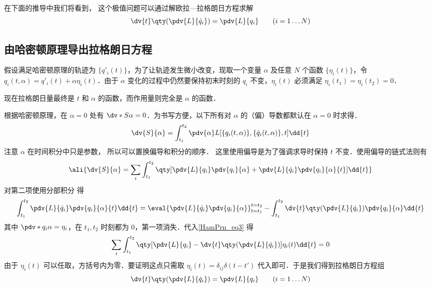 在下面的推导中我们将看到， 这个极值问题可以通过解欧拉—拉格朗日方程求解
\begin{equation}
\dv{t} \qty(\pdv{L}{\dot q_i}) = \pdv{L}{q_i} \qquad
(i = 1\dots N)
\end{equation}

\subsection{由哈密顿原理导出拉格朗日方程}

假设满足哈密顿原理的轨迹为 $\{q'_i(t)\}$，为了让轨迹发生微小改变，现取一个变量 $\alpha$ 及任意 $N$ 个函数 $\{\eta_i(t)\}$，令 $q_i(t,\alpha ) = q'_i(t) + \alpha \eta_i(t)$．由于 $\alpha$ 变化的过程中仍然要保持初末时刻的 $q_i$ 不变，$\eta_i(t)$ 必须满足 $\eta_i(t_1) = \eta_i(t_2) = 0$．

现在拉格朗日量最终是 $t$ 和 $\alpha$ 的函数，而作用量则完全是 $\alpha$ 的函数．
 
根据哈密顿原理，在 $\alpha = 0$ 处有 $\dv*{S}{\alpha} = 0$．为书写方便，以下所有对 $\alpha$ 的（偏）导数都默认在 $\alpha=0$ 时求得．
\begin{equation}
\dv{S}{\alpha} = \int_{t_1}^{t_2} \pdv{\alpha} L[\{q_i(t,\alpha )\}, \{\dot q_i(t,\alpha)\}, t] \dd{t}
\end{equation}
注意 $\alpha$ 在时间积分中只是参数， 所以可以置换偏导和积分的顺序． %
这里使用偏导是为了强调求导时保持 $t$ 不变．使用偏导的链式法则有
\begin{equation}\label{HamPrn_eq3}
\ali{
\dv{S}{\alpha} =
\sum_i \int_{t_1}^{t_2} \qty[\pdv{L}{q_i} \pdv{q_i}{\alpha} + \pdv{L}{\dot q_i}\pdv{q_i}{\alpha}{t}] \dd{t}
}\end{equation}
对第二项使用分部积分 得
\begin{equation}
\int_{t_1}^{t_2} \pdv{L}{\dot q_i} \pdv{q_i}{\alpha}{t} \dd{t}  = \eval{\pdv{L}{\dot q_i}\pdv{q_i}{\alpha}}_{t = t_1}^{t = t_2} - \int_{t_1}^{t_2} \dv{t} \qty(\pdv{L}{\dot q_i})\pdv{q_i}{\alpha} \dd{t}
\end{equation}
其中 $\pdv*{q_i}{\alpha}  = \eta_i$，在 $t_1, t_2$ 时刻都为 0，第一项消失．代入\autoref{HamPrn_eq3} 得
\begin{equation}
\sum_i \int_{t_1}^{t_2} \qty[\pdv{L}{q_i} - \dv{t} \qty(\pdv{L}{\dot q_i})] \eta_i(t) \dd{t} = 0
\end{equation}
由于 $\eta_i(t)$ 可以任取，方括号内为零．要证明这点只需取 $\eta_i(t) = \delta_{ij}\delta(t - t')$ 代入即可．于是我们得到拉格朗日方程组
\begin{equation}\label{HamPrn_eq2}
\dv{t} \qty(\pdv{L}{\dot q_i}) = \pdv{L}{q_i} \qquad
(i = 1\dots N)
\end{equation}
